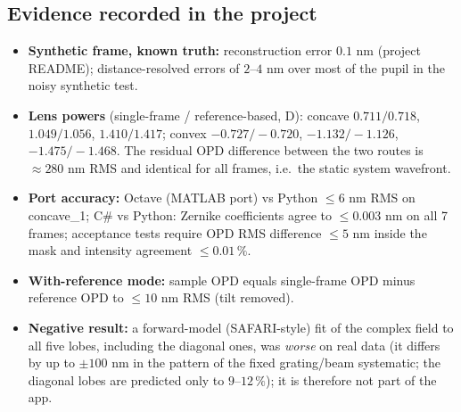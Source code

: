 \documentclass[11pt,a4paper]{article}
\theoremstyle{definition}
\begin{document}
\subsection{Evidence recorded in the project}
\begin{itemize}
\item \textbf{Synthetic frame, known truth:} reconstruction error $0.1$ nm (project README); distance-resolved errors of $2$--$4$ nm over most of the pupil in the noisy synthetic test.
\item \textbf{Lens powers} (single-frame / reference-based, D): concave $0.711/0.718$, $1.049/1.056$, $1.410/1.417$; convex $-0.727/-0.720$, $-1.132/-1.126$, $-1.475/-1.468$. The residual OPD difference between the two routes is $\approx280$ nm RMS and identical for all frames, i.e.\ the static system wavefront.
\item \textbf{Port accuracy:} Octave (MATLAB port) vs Python $\le6$ nm RMS on concave\_1; C\# vs Python: Zernike coefficients agree to $\le0.003$ nm on all 7 frames; acceptance tests require OPD RMS difference $\le5$ nm inside the mask and intensity agreement $\le0.01\,\%$.
\item \textbf{With-reference mode:} sample OPD equals single-frame OPD minus reference OPD to $\le10$ nm RMS (tilt removed).
\item \textbf{Negative result:} a forward-model (SAFARI-style) fit of the complex field to all five lobes, including the diagonal ones, was \emph{worse} on real data (it differs by up to $\pm100$ nm in the pattern of the fixed grating/beam systematic; the diagonal lobes are predicted only to $9$--$12\,\%$); it is therefore not part of the app.
\end{itemize}
\end{document}

